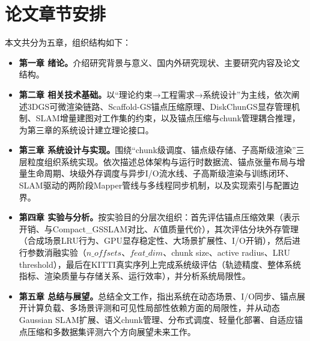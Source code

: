\section{论文章节安排}

本文共分为五章，组织结构如下：

\begin{itemize}
    \item \textbf{第一章 绪论。}介绍研究背景与意义、国内外研究现状、主要研究内容及论文结构。

    \item \textbf{第二章 相关技术基础。}以``理论约束→工程需求→系统设计''为主线，依次阐述3DGS可微渲染链路、Scaffold-GS锚点压缩原理、DiskChunGS显存管理机制、SLAM增量建图对工作集的约束，以及锚点压缩与chunk管理耦合推理，为第三章的系统设计建立理论接口。

    \item \textbf{第三章 系统设计与实现。}围绕``chunk级调度、锚点级存储、子高斯级渲染''三层粒度组织系统实现。依次描述总体架构与运行时数据流、锚点张量布局与增量生命周期、块级外存调度与异步I/O流水线、子高斯级渲染与训练闭环、SLAM驱动的两阶段Mapper管线与多线程同步机制，以及实现索引与配置边界。

    \item \textbf{第四章 实验与分析。}按实验目的分层次组织：首先评估锚点压缩效果（表示开销、与Compact\_GSSLAM对比、$K$值质量代价），其次评估分块外存管理（合成场景LRU行为、GPU显存稳定性、大场景扩展性、I/O开销），然后进行参数消融实验（$n\_offsets$、$feat\_dim$、chunk size、active radius、LRU threshold），最后在KITTI真实序列上完成系统级评估（轨迹精度、整体系统指标、渲染质量与存储关系、运行效率），并分析系统局限性。

    \item \textbf{第五章 总结与展望。}总结全文工作，指出系统在动态场景、I/O同步、锚点展开计算负载、多场景评测和可见性局部性依赖方面的局限性，并从动态Gaussian SLAM扩展、语义chunk管理、分布式调度、轻量化部署、自适应锚点压缩和多数据集评测六个方向展望未来工作。
\end{itemize}
